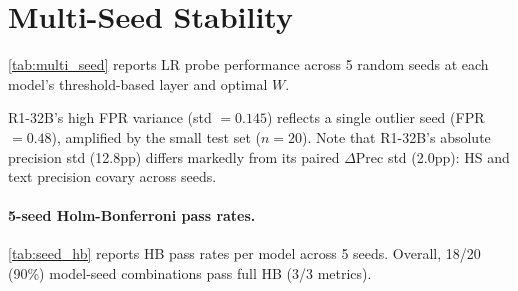 \section{Multi-Seed Stability}
\label{app:multi_seed}

\cref{tab:multi_seed} reports LR probe performance across 5 random seeds at each model's threshold-based layer and optimal $W$.

\begin{table}[htbp]
\centering
\small
\caption{LR probe stability across 5 random seeds (threshold-based layers, optimal $W$). 7--8B models are stable; R1-32B shows high variance due to small sample ($n{=}20$).}
\label{tab:multi_seed}
\end{table}

R1-32B's high FPR variance (std $= 0.145$) reflects a single outlier seed (FPR $= 0.48$), amplified by the small test set ($n{=}20$). Note that R1-32B's absolute precision std (12.8pp) differs markedly from its paired $\Delta$Prec std (2.0pp): HS and text precision covary across seeds.

\paragraph{5-seed Holm-Bonferroni pass rates.} \cref{tab:seed_hb} reports HB pass rates per model across 5 seeds. Overall, 18/20 (90\%) model-seed combinations pass full HB (3/3 metrics).

\begin{table}[htbp]
\centering
\small
\caption{5-seed HB pass rates (3/3 metrics per seed). R1-8B failures are FPR-specific.}
\label{tab:seed_hb}
\end{table}

